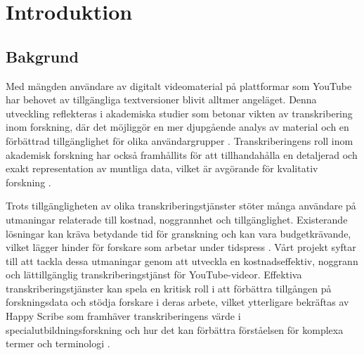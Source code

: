 \chapter{Introduktion}

\section{Bakgrund}
Med mängden användare av digitalt videomaterial på plattformar som YouTube har
behovet av tillgängliga textversioner blivit alltmer angeläget. Denna
utveckling reflekteras i akademiska studier som betonar vikten av
transkribering inom forskning, där det möjliggör en mer djupgående analys av
material och en förbättrad tillgänglighet för olika användargrupper
\cite{RevBlog2019}. Transkriberingens roll inom akademisk forskning har också
framhållits för att tillhandahålla en detaljerad och exakt representation av
muntliga data, vilket är avgörande för kvalitativ forskning
\cite{OxfordAcademicND}.

Trots tillgängligheten av olika transkriberingstjänster stöter många användare
på utmaningar relaterade till kostnad, noggrannhet och tillgänglighet.
Existerande lösningar kan kräva betydande tid för granskning och kan vara
budgetkrävande, vilket lägger hinder för forskare som arbetar under tidspress
\cite{RevBlog2019}. Vårt projekt syftar till att tackla dessa utmaningar genom
att utveckla en kostnadseffektiv, noggrann och lättillgänglig
transkriberingstjänst för YouTube-videor. Effektiva transkriberingstjänster
kan spela en kritisk roll i att förbättra tillgången på forskningsdata och
stödja forskare i deras arbete, vilket ytterligare bekräftas av Happy Scribe
som framhäver transkriberingens värde i specialutbildningsforskning och hur
det kan förbättra förståelsen för komplexa termer och terminologi
\cite{HappyScribeND}.

